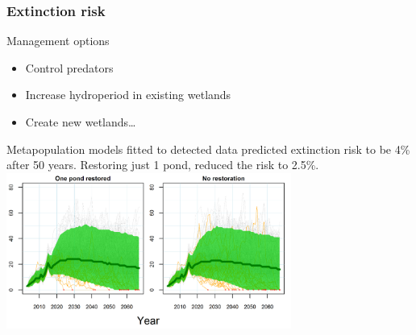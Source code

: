 \documentclass[color=usenames,dvipsnames]{beamer}\usepackage[]{graphicx}\usepackage[]{xcolor}
\begin{document}
\begin{frame}
  \frametitle{Extinction risk}
  \small
   Management options 
   \begin{itemize} \small
     \item<1-> Control predators
     \item<1-> Increase hydroperiod in existing wetlands
     \item<1-> Create new wetlands\dots
   \end{itemize}
   \vfill
    Metapopulation models fitted to detected data predicted extinction
    risk to be 4\% after 50 years. Restoring just 1 pond, reduced the
    risk to 2.5\%.   \\
  \vfill
  \centering
  \includegraphics[width=0.7\textwidth]{figs/lich-forecasts} \\
\end{frame}
\end{document}
